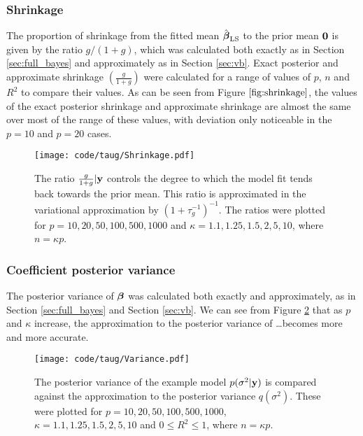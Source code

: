 \documentclass{amsart}[12pt]
\begin{document}
\subsubsection{Shrinkage}

The proportion of shrinkage from the fitted mean $\hat{{\boldsymbol \beta}}_{\text{LS}}$ to the prior mean ${\bf 0}$ is given by the
ratio $g/(1 + g)$, which was calculated both exactly as in Section \ref{sec:full_bayes} and approximately as
in Section \ref{sec:vb}. Exact posterior and approximate shrinkage $\left( \frac{g}{1 + g} \right)$ were
calculated for a range of values of $p$, $n$ and $R^2$ to compare their values. As can be seen from Figure
$\ref{fig:shrinkage}$, the values of the exact posterior shrinkage and approximate shrinkage are almost the
same over most of the range of these values, with deviation only noticeable in the $p=10$ and $p=20$ cases.

\begin{figure}[p]
	\texttt{[image: code/taug/Shrinkage.pdf]}
	\caption{The ratio $\frac{g}{1 + g} | {\bf y}$ controls the degree to which the model fit tends back towards
		the prior mean. This ratio is approximated in the variational approximation by $(1 + \tau_g^{-1})^{-1}$. 
		The ratios were plotted for $p =10, 20, 50, 100, 500, 1000$ and $\kappa = 1.1, 1.25, 1.5, 2, 5, 10$, where
		$n = \kappa p$.}
	\label{fig:shrinkage}
\end{figure}

\subsubsection{Coefficient posterior variance}

The posterior variance of ${\boldsymbol \beta}$ was calculated both exactly and approximately, as in Section
\ref{sec:full_bayes} and Section \ref{sec:vb}. We can see from Figure \ref{fig:variance} that as $p$ and
$\kappa$ increase, the approximation to the posterior variance of \ldots becomes more and more accurate.

\begin{figure}[p]
	\texttt{[image: code/taug/Variance.pdf]}
	\caption{The posterior variance of the example model $p(\sigma^2 | {\bf y})$ is compared against the approximation
		to the posterior variance $q(\sigma^2)$. These were plotted for $p =10, 20, 50, 100, 500, 1000$, $\kappa = 1.1, 1.25, 1.5, 2, 5, 10$ and $0 \leq R^2 \leq 1$, where $n = \kappa p$.}
	\label{fig:variance}
\end{figure}
\end{document}
